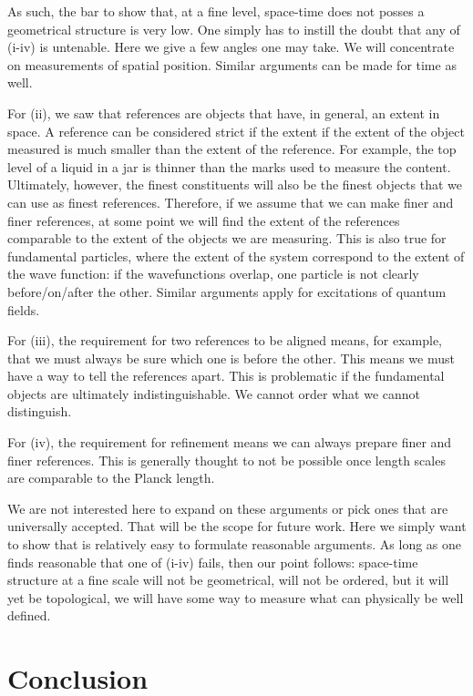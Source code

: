\documentclass[12pt]{iopart}
\begin{document}
As such, the bar to show that, at a fine level, space-time does not posses a geometrical structure is very low. One simply has to instill the doubt that any of (i-iv) is untenable. Here we give a few angles one may take. We will concentrate on measurements of spatial position. Similar arguments can be made for time as well.

For (ii), we saw that references are objects that have, in general, an extent in space. A reference can be considered strict if the extent if the extent of the object measured is much smaller than the extent of the reference. For example, the top level of a liquid in a jar is thinner than the marks used to measure the content. Ultimately, however, the finest constituents will also be the finest objects that we can use as finest references. Therefore, if we assume that we can make finer and finer references, at some point we will find the extent of the references comparable to the extent of the objects we are measuring. This is also true for fundamental particles, where the extent of the system correspond to the extent of the wave function: if the wavefunctions overlap, one particle is not clearly before/on/after the other. Similar arguments apply for excitations of quantum fields.

For (iii), the requirement for two references to be aligned means, for example, that we must always be sure which one is before the other. This means we must have a way to tell the references apart. This is problematic if the fundamental objects are ultimately indistinguishable. We cannot order what we cannot distinguish.

For (iv), the requirement for refinement means we can always prepare finer and finer references. This is generally thought to not be possible once length scales are comparable to the Planck length.

We are not interested here to expand on these arguments or pick ones that are universally accepted. That will be the scope for future work. Here we simply want to show that is relatively easy to formulate reasonable arguments. As long as one finds reasonable that one of (i-iv) fails, then our point follows: space-time structure at a fine scale will not be geometrical, will not be ordered, but it will yet be topological, we will have some way to measure what can physically be well defined.


\section{Conclusion}
\end{document}
